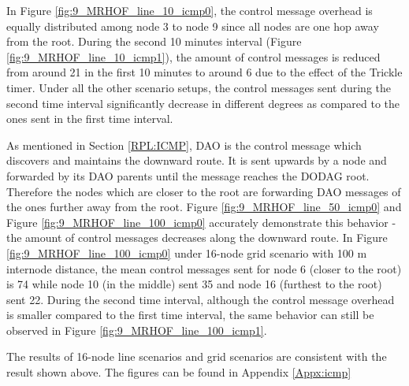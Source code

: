 In Figure \ref{fig:9_MRHOF_line_10_icmp0}, the control message overhead is equally distributed among node 3 to node 9 since all nodes are one hop away from the root. During the second 10 minutes interval (Figure \ref{fig:9_MRHOF_line_10_icmp1}), the amount of control messages is reduced from around 21 in the first 10 minutes to around 6 due to the effect of the Trickle timer. Under all the other scenario setups, the control messages sent during the second time interval significantly decrease in different degrees as compared to the ones sent in the first time interval.
\newline

As mentioned in Section \ref{RPL:ICMP}, DAO is the control message which discovers and maintains the downward  route. It is sent upwards by a node and forwarded by its DAO parents until the message reaches the DODAG root. Therefore the nodes which are closer to the root are forwarding DAO messages of the ones further away from the root. Figure \ref{fig:9_MRHOF_line_50_icmp0} and Figure \ref{fig:9_MRHOF_line_100_icmp0} accurately demonstrate this behavior - the amount of control messages decreases along the downward route. In Figure \ref{fig:9_MRHOF_line_100_icmp0} under 16-node grid scenario with 100 m internode distance, the mean control messages sent for node 6 (closer to the root) is 74 while node 10 (in the middle) sent 35 and node 16 (furthest to the root) sent 22. During the second time interval, although the control message overhead is smaller compared to the first time interval, the same behavior can still be observed in Figure \ref{fig:9_MRHOF_line_100_icmp1}.
\newline 

The results of 16-node line scenarios and grid scenarios are consistent with the result shown above. The figures can be found in Appendix \ref{Appx:icmp}
  
